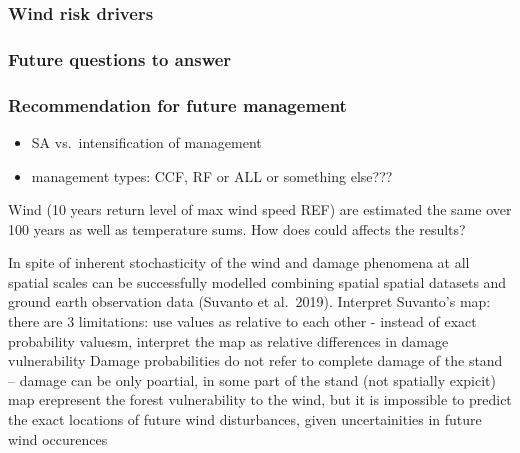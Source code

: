 \documentclass[]{elsarticle} %
\providecommand{\tightlist}{%
  \setlength{\itemsep}{0pt}\setlength{\parskip}{0pt}}
\begin{document}
\hypertarget{wind-risk-drivers}{%
\subsubsection{Wind risk drivers}\label{wind-risk-drivers}}

\hypertarget{future-questions-to-answer}{%
\subsubsection{Future questions to
answer}\label{future-questions-to-answer}}

\hypertarget{recommendation-for-future-management}{%
\subsubsection{Recommendation for future
management}\label{recommendation-for-future-management}}

\begin{itemize}
\tightlist
\item
  SA vs.~intensification of management
\item
  management types: CCF, RF or ALL or something else???
\end{itemize}

Wind (10 years return level of max wind speed REF) are estimated the
same over 100 years as well as temperature sums. How does could affects
the results?

In spite of inherent stochasticity of the wind and damage phenomena at
all spatial scales can be successfully modelled combining spatial
spatial datasets and ground earth observation data (Suvanto et
al.~2019). Interpret Suvanto's map: there are 3 limitations: use values
as relative to each other - instead of exact probability valuesm,
interpret the map as relative differences in damage vulnerability Damage
probabilities do not refer to complete damage of the stand -- damage can
be only poartial, in some part of the stand (not spatially expicit) map
erepresent the forest vulnerability to the wind, but it is impossible to
predict the exact locations of future wind disturbances, given
uncertainities in future wind occurences
\end{document}
